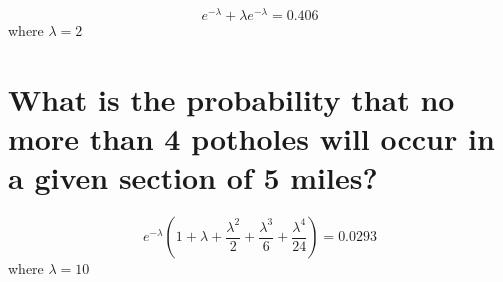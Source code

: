 \documentclass[answers]{exam}
\begin{document}
\begin{questions}
\begin{parts}
	\begin{solution}
		$$e^{-\lambda} + \lambda e^{-\lambda} = 0.406$$
		where $\lambda = 2$
	\end{solution}

	\part{What is the probability that no more than 4 potholes will occur in a given section of 5 miles?}

	\begin{solution}
		$$e^{-\lambda}\left(1 + \lambda + \frac{\lambda^2}{2} + \frac{\lambda^3}{6} + \frac{\lambda^4}{24}\right) = 0.0293$$
		where $\lambda = 10$
	\end{solution}
\end{parts}
\end{questions}
\end{document}
